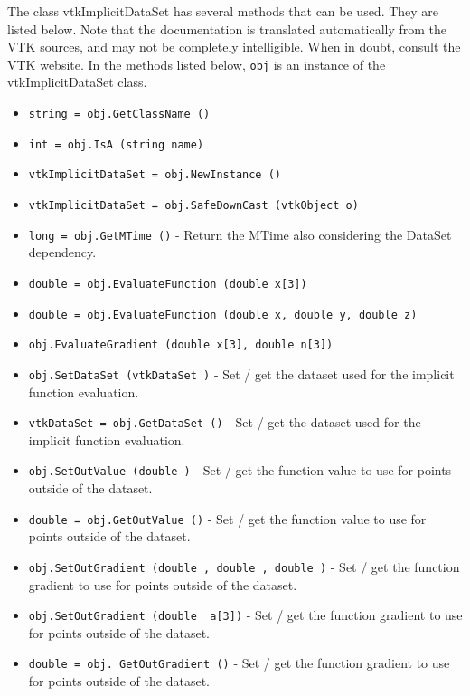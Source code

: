 The class vtkImplicitDataSet has several methods that can be used.
  They are listed below.
Note that the documentation is translated automatically from the VTK sources,
and may not be completely intelligible.  When in doubt, consult the VTK website.
In the methods listed below, \verb|obj| is an instance of the vtkImplicitDataSet class.
\begin{itemize}
\item  \verb|string = obj.GetClassName ()|

\item  \verb|int = obj.IsA (string name)|

\item  \verb|vtkImplicitDataSet = obj.NewInstance ()|

\item  \verb|vtkImplicitDataSet = obj.SafeDownCast (vtkObject o)|

\item  \verb|long = obj.GetMTime ()| -  Return the MTime also considering the DataSet dependency.

\item  \verb|double = obj.EvaluateFunction (double x[3])|

\item  \verb|double = obj.EvaluateFunction (double x, double y, double z)|

\item  \verb|obj.EvaluateGradient (double x[3], double n[3])|

\item  \verb|obj.SetDataSet (vtkDataSet )| -  Set / get the dataset used for the implicit function evaluation.

\item  \verb|vtkDataSet = obj.GetDataSet ()| -  Set / get the dataset used for the implicit function evaluation.

\item  \verb|obj.SetOutValue (double )| -  Set / get the function value to use for points outside of the dataset.

\item  \verb|double = obj.GetOutValue ()| -  Set / get the function value to use for points outside of the dataset.

\item  \verb|obj.SetOutGradient (double , double , double )| -  Set / get the function gradient to use for points outside of the dataset.

\item  \verb|obj.SetOutGradient (double  a[3])| -  Set / get the function gradient to use for points outside of the dataset.

\item  \verb|double = obj. GetOutGradient ()| -  Set / get the function gradient to use for points outside of the dataset.

\end{itemize}
